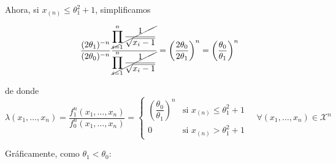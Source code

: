 \documentclass[12pt]{article}
\newcommand{\X}{\mathcal{X}}
\begin{document}
\begin{ejercicio}
        Ahora, si $x_{(n)} \leq \theta_1^2 + 1$, simplificamos

        $$\dfrac{(2\theta_1)^{-n}}{(2\theta_0)^{-n}} \dfrac{\cancel{\displaystyle\prod_{i=1}^{n} \frac{1}{\sqrt{x_i-1}}}}
        {\cancel{\displaystyle \prod_{i=1}^{n} \frac{1}{\sqrt{x_i-1}}}} = \left(\dfrac{2 \theta_0}{2 \theta_1} \right)^{n} = \left(\dfrac{\theta_0}{\theta_1} \right)^{n}$$

        de donde
        $$\lambda(x_1, \ldots, x_n) = \dfrac{f_1^n(x_1, \ldots, x_n)}{f_0^n(x_1, \ldots, x_n)} = 
        \begin{cases} 
            \left( \dfrac{\theta_0}{\theta_1} \right)^{n} &\text{si } x_{(n)} \leq \theta_1^2 + 1 \\ 
            0 &\text{si } x_{(n)} > \theta_1^2 + 1 
        \end{cases} \quad \forall (x_1, \ldots, x_n) \in \X^n$$

        Gráficamente, como $\theta_1 < \theta_0$:

        \begin{center}

            \begin{tikzpicture}[x=0.75pt,y=0.75pt,yscale=-1,xscale=1]


\end{tikzpicture}
\end{center}
\end{ejercicio}
\end{document}

